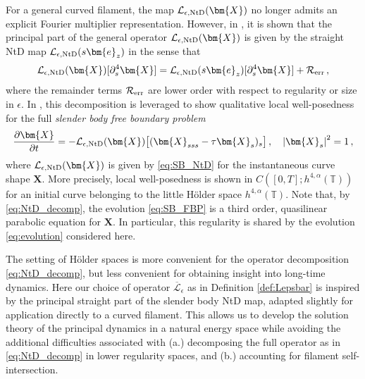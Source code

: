\documentclass[11pt,reqno]{amsart}
\newcommand{\T}{\mathbb{T}}
\newcommand{\X}{\bm{X}}
\newcommand{\be}{\bm{e}}
\newcommand{\p}{\partial}
\newcommand{\abs}[1]{\left\lvert #1 \right\rvert}
\newcommand{\mc}[1]{\mathcal{#1}}
\numberwithin{equation}{section}
\theoremstyle{definition}
\begin{document}
For a general curved filament, the map $\mc{L}_{\epsilon,\rm NtD}(\X)$ no longer admits an explicit Fourier multiplier representation. However, in \cite[Theorem 1.5 \& Corollary 1.6]{ohm2024free}, it is shown that the principal part of the general operator $\mc{L}_{\epsilon,\rm NtD}(\X)$ is given by the straight NtD map $\mc{L}_{\epsilon,\rm NtD}(s\be_z)$ in the sense that
\begin{equation}\label{eq:NtD_decomp}
  \mc{L}_{\epsilon,\rm NtD}(\X)[\p_s^4\X] = \mc{L}_{\epsilon,\rm NtD}(s\be_z)[\p_s^4\X] + \mc{R}_{\rm err}\,,
\end{equation}
where the remainder terms $\mc{R}_{\rm err}$ are lower order with respect to regularity or size in $\epsilon$. In \cite[Theorem 1.1]{ohm2025slender}, this decomposition is leveraged to show qualitative local well-posedness for the full \emph{slender body free boundary problem}
\begin{equation}\label{eq:SB_FBP}
  \frac{\p\X}{\p t} = -\mc{L}_{\epsilon,\rm NtD}(\X)\big[(\X_{sss}-\tau\X_s)_s\big] \,, \quad \abs{\X_s}^2=1\,,
\end{equation}
where $\mc{L}_{\epsilon,\rm NtD}(\X)$ is given by \eqref{eq:SB_NtD} for the instantaneous curve shape $\X$. More precisely, local well-posedness is shown in $C([0,T];h^{4,\alpha}(\T))$ for an initial curve belonging to the little H\"older space $h^{4,\alpha}(\T)$. Note that, by \eqref{eq:NtD_decomp}, the evolution \eqref{eq:SB_FBP} is a third order, quasilinear parabolic equation for $\X$. In particular, this regularity is shared by the evolution \eqref{eq:evolution} considered here.  

The setting of H\"older spaces is more convenient for the operator decomposition \eqref{eq:NtD_decomp}, but less convenient for obtaining insight into long-time dynamics. Here our choice of operator $\overline{\mc{L}}_\epsilon$ as in Definition \ref{def:Lepsbar} is inspired by the principal straight part of the slender body NtD map, adapted slightly for application directly to a curved filament. This allows us to develop the solution theory of the principal dynamics in a natural energy space while avoiding the additional difficulties associated with (a.) decomposing the full operator as in \eqref{eq:NtD_decomp} in lower regularity spaces, and (b.) accounting for filament self-intersection. 







\end{document}
